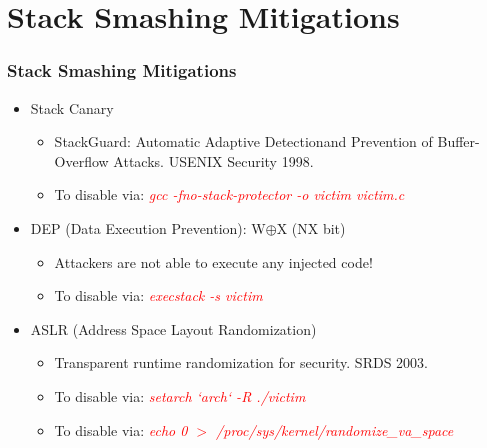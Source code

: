 \documentclass[aspectratio=169]{beamer}
\begin{document}
\section{Stack Smashing Mitigations}
\begin{frame}
\frametitle{Stack Smashing Mitigations}
\begin{itemize}
\item Stack Canary
	\begin{itemize}
		\item StackGuard: Automatic Adaptive Detectionand Prevention of Buffer-Overflow Attacks. USENIX Security 1998. \pause
		\item To disable via: \textit{\textcolor{red}{gcc -fno-stack-protector -o victim victim.c}} \pause
	\end{itemize}
\item DEP (Data Execution Prevention): W$\oplus$X (NX bit)
	\begin{itemize}
		\item Attackers are not able to execute any injected code!
		\item To disable via: \textit{\textcolor{red}{execstack -s victim}} \pause
	\end{itemize}
\item ASLR (Address Space Layout Randomization)
	\begin{itemize}
		\item Transparent runtime randomization for security. SRDS 2003. \pause
		\item To disable via: \textit{\textcolor{red}{setarch `arch` -R ./victim}}
		\item To disable via: \textit{\textcolor{red}{echo 0 $>$ /proc/sys/kernel/randomize\_va\_space}}
	\end{itemize}
\end{itemize}
\end{frame}

\end{document}
